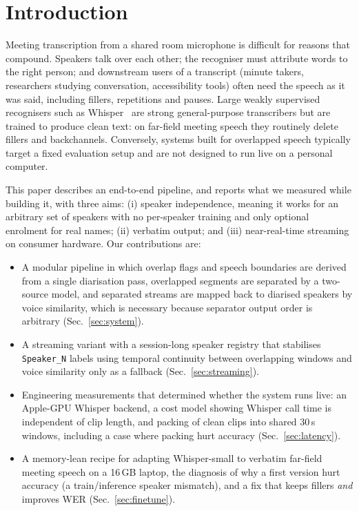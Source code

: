 \documentclass[conference]{IEEEtran}
\begin{document}
\section{Introduction}
Meeting transcription from a shared room microphone is difficult for reasons that compound. Speakers talk over each other; the recogniser must attribute words to the right person; and downstream users of a transcript (minute takers, researchers studying conversation, accessibility tools) often need the speech as it was said, including fillers, repetitions and pauses. Large weakly supervised recognisers such as Whisper~\cite{radford2023whisper} are strong general-purpose transcribers but are trained to produce clean text: on far-field meeting speech they routinely delete fillers and backchannels. Conversely, systems built for overlapped speech typically target a fixed evaluation setup and are not designed to run live on a personal computer.

This paper describes an end-to-end pipeline, and reports what we measured while building it, with three aims: (i) speaker independence, meaning it works for an arbitrary set of speakers with no per-speaker training and only optional enrolment for real names; (ii) verbatim output; and (iii) near-real-time streaming on consumer hardware. Our contributions are:
\begin{itemize}
\item A modular pipeline in which overlap flags and speech boundaries are derived from a single diarisation pass, overlapped segments are separated by a two-source model, and separated streams are mapped back to diarised speakers by voice similarity, which is necessary because separator output order is arbitrary (Sec.~\ref{sec:system}).
\item A streaming variant with a session-long speaker registry that stabilises \texttt{Speaker\_N} labels using temporal continuity between overlapping windows and voice similarity only as a fallback (Sec.~\ref{sec:streaming}).
\item Engineering measurements that determined whether the system runs live: an Apple-GPU Whisper backend, a cost model showing Whisper call time is independent of clip length, and packing of clean clips into shared 30\,s windows, including a case where packing hurt accuracy (Sec.~\ref{sec:latency}).
\item A memory-lean recipe for adapting Whisper-small to verbatim far-field meeting speech on a 16\,GB laptop, the diagnosis of why a first version hurt accuracy (a train/inference speaker mismatch), and a fix that keeps fillers \emph{and} improves WER (Sec.~\ref{sec:finetune}).
\end{itemize}
\end{document}
